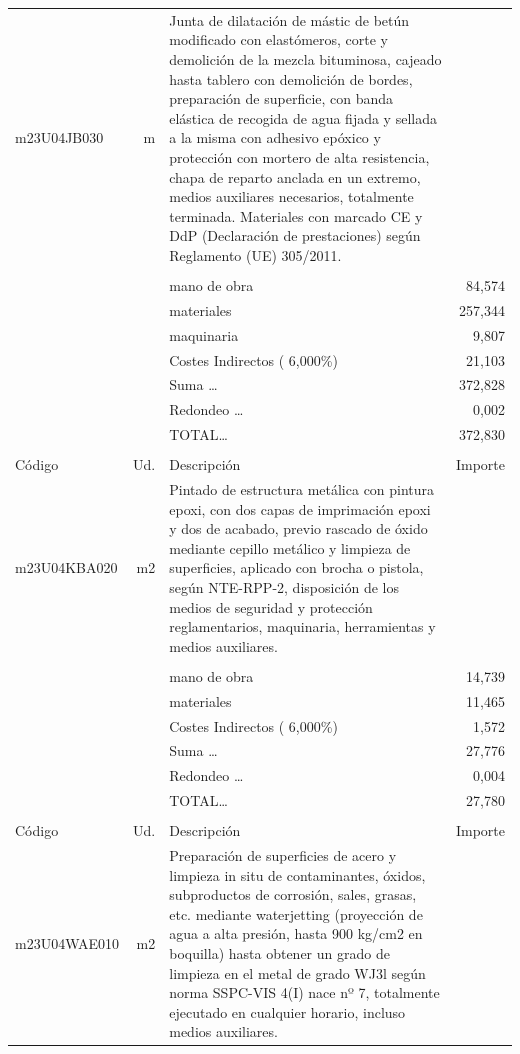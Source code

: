 \documentclass{book}%
\begin{document}
\begin{supertabular}{l r p{60mm} r}
\hline%
m23U04JB030&m&Junta de dilatación de mástic de betún modificado con elastómeros, corte y demolición de la mezcla bituminosa, cajeado hasta tablero con demolición de bordes, preparación de superficie, con banda elástica de recogida de agua fijada y sellada a la misma con adhesivo epóxico y protección con mortero de alta resistencia, chapa de reparto anclada en un extremo, medios auxiliares necesarios, totalmente terminada. Materiales con marcado CE y DdP (Declaración de prestaciones) según Reglamento (UE) 305/2011.&\\%
&&&\\%
&&mano de obra&    84,574\\%
&&materiales&   257,344\\%
&&maquinaria&     9,807\\%
&&Costes Indirectos (     6,000\%)&    21,103\\%
&&Suma \ldots&   372,828\\%
&&Redondeo \ldots&     0,002\\%
%
&&TOTAL\ldots&   372,830\\%
&&&\\%
Código&Ud.&Descripción&Importe\\%
\hline%
m23U04KBA020&m2&Pintado de estructura metálica con pintura epoxi, con dos capas de imprimación epoxi y dos de acabado, previo rascado de óxido mediante cepillo metálico y limpieza de superficies, aplicado con brocha o pistola, según NTE{-}RPP{-}2, disposición de los medios de seguridad y protección reglamentarios, maquinaria, herramientas y medios auxiliares.&\\%
&&&\\%
&&mano de obra&    14,739\\%
&&materiales&    11,465\\%
&&Costes Indirectos (     6,000\%)&     1,572\\%
&&Suma \ldots&    27,776\\%
&&Redondeo \ldots&     0,004\\%
%
&&TOTAL\ldots&    27,780\\%
&&&\\%
Código&Ud.&Descripción&Importe\\%
\hline%
m23U04WAE010&m2&Preparación de superficies de acero y limpieza in situ de contaminantes, óxidos, subproductos de corrosión, sales, grasas, etc. mediante waterjetting (proyección de agua a alta presión, hasta 900 kg/cm2 en boquilla) hasta obtener un grado de limpieza en el metal de grado WJ3l según norma SSPC{-}VIS 4(I) nace nº 7, totalmente ejecutado en cualquier horario, incluso medios auxiliares.&\\%

\end{supertabular}
\end{document}
